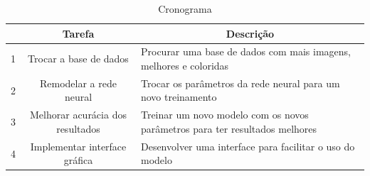 \begin{table}[htbp]
    \centering
    \caption{Cronograma}
    \label{tab:cronograma}
    \begin{tabular}{|c|c|p{8cm}|}
        \hline
        \textbf{} & \textbf{Tarefa} & \multicolumn{1}{c|}{\textbf{Descrição}}\\
        \hline
        1 & Trocar a base de dados & Procurar uma base de dados com mais imagens, melhores e coloridas \\
        \hline
        2 & Remodelar a rede neural & Trocar os parâmetros da rede neural para um novo treinamento \\
        \hline
        3 & Melhorar acurácia dos resultados & Treinar um novo modelo com os novos parâmetros para ter resultados melhores \\
        \hline
        4 & Implementar interface gráfica  & Desenvolver uma interface para facilitar o uso do modelo \\
        \hline
    \end{tabular}
\end{table}